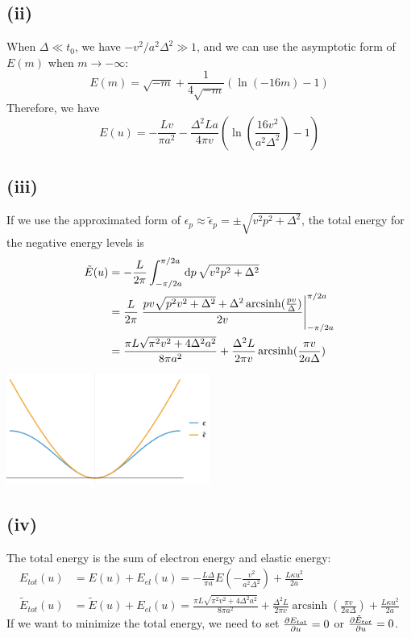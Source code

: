 \documentclass{article}
\DeclareMathOperator{\arcsinh}{arcsinh}
\begin{document}
\subsection*{(ii)}
When $\Delta\ll t_0$, we have $-v^2/a^2\Delta^2\gg 1$, and we can use the asymptotic form of $E(m)$ when $m\to -\infty$:
\begin{equation}
    E(m)=\sqrt{-m}+\frac{1}{4\sqrt{-m}}\left(\ln(-16m)-1\right)
\end{equation}
Therefore, we have 
\begin{equation}
    E(u)=-\frac{Lv}{\pi a^2}-\frac{\Delta^2 La}{4\pi v}\left(\ln\left(\frac{16v^2}{a^2\Delta^2}\right)-1\right)
\end{equation}

\subsection*{(iii)}
If we use the approximated form of $\epsilon_p\approx\tilde{\epsilon}_p=\pm\sqrt{v^2 p^2+\Delta^2}$, the total energy for the negative energy levels is
\begin{equation}
    \begin{split}
        \tilde{E}(u)&=-\frac{L}{2\pi}\int_{-\pi/2a}^{\pi/2a}\dd{p}\sqrt{v^2 p^2+\Delta^2}\\
                    &=\frac{L}{2\pi}\eval{\frac{pv\sqrt{p^2 v^2+\Delta^2}+\Delta^2\arcsinh(\frac{pv}{\Delta})}{2v}}_{-\pi/2a}^{\pi/2a}\\
                    &=\frac{\pi L\sqrt{\pi^2 v^2+4\Delta^2 a^2}}{8\pi a^2}+\frac{\Delta^2 L}{2\pi v}\arcsinh(\frac{\pi v}{2a\Delta})
    \end{split}
\end{equation}
\begin{center}
    \includegraphics[width=0.5\textwidth]{plot/plot1.pdf}
\end{center}

\subsection*{(iv)}
The total energy is the sum of electron energy and elastic energy:
\begin{subequations}
    \begin{align}
        E_{tot}(u)&=E(u)+E_{el}(u)= -\frac{L\Delta}{\pi a}E\left(-\frac{v^2}{a^2\Delta^2}\right)+\frac{L\kappa u^2}{2a}\\
    \tilde{E}_{tot}(u)&=\tilde{E}(u)+E_{el}(u)= \frac{\pi L\sqrt{\pi^2 v^2+4\Delta^2 a^2}}{8\pi a^2}+\frac{\Delta^2 L}{2\pi v}\arcsinh(\frac{\pi v}{2a\Delta})+\frac{L\kappa u^2}{2a}
    \end{align}
\end{subequations}
If we want to minimize the total energy, we need to set $\pdv{E_{tot}}{u}=0$ or $\pdv{\tilde{E}_{tot}}{u}=0$.
\end{document}
